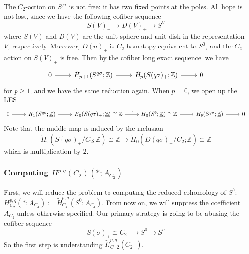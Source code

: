 \documentclass{article}
\theoremstyle{definition}
\theoremstyle{definition}
\theoremstyle{definition}
\theoremstyle{definition}
\theoremstyle{definition}
\theoremstyle{definition}
\theoremstyle{definition}
\begin{document}
The $C_2$-action on $S^{q\sigma}$ is not free: it has two fixed points at the poles. All hope is not lost, since we have the following cofiber sequence 
\[S(V)_{+}\to D(V)_{+}\to S^V\]
where $S(V)$ and $D(V)$ are the unit sphere and unit disk in the representation $V$, respectively. Moreover, $D(n)_{+}$ is $C_2$-homotopy equivalent to $S^0$, and the $C_2$-action on $S(V)_+$ is free. Then by the cofiber long exact sequence, we have 
\[\begin{tikzcd}
0\arrow[r]&\tilde{H}_{p+1}(S^{q\sigma};\underline{\mathbb{Z}})\arrow[r]&\tilde{H}_{p}(S(q\sigma)_+;\underline{\mathbb{Z}})\arrow[r]&0
\end{tikzcd}\]
for $p\geq 1$, and we have the same reduction again. When $p=0$, we open up the LES 
\[\begin{tikzcd}
 0\arrow[r]&\tilde{H}_{1}(S^{q\sigma};\underline{\mathbb{Z}})\arrow[r]&\tilde{H}_{0}(S(q\sigma)_+;\underline{\mathbb{Z}})\cong \mathbb{Z}\arrow[r,"\gamma"]&\tilde{H}_{0}(S^0;\underline{\mathbb{Z}})\cong \mathbb{Z}\arrow[r]&\tilde{H}_{0}(S^{q\sigma};\underline{\mathbb{Z}})\arrow[r]&0
    \end{tikzcd}\]
Note that the middle map is induced by the inclusion 
\[\tilde{H}_0(S(q\sigma)_+/C_2;\mathbb{Z})\cong \mathbb{Z}\to \tilde{H}_0(D(q\sigma)_+/C_2;\mathbb{Z})\cong \mathbb{Z}\]
which is multiplication by $2$. 

\subsubsection{Computing $H^{p,q}(C_2)(*; A_{C_2})$}
First, we will reduce the problem to computing the reduced cohomology of $S^0$: $H^{p,q}_{C_2}(*; A_{C_2}):= \tilde{H}^{p,q}_{C_2}(S^0; A_{C_2})$. From now on, we will suppress the coefficient $A_{C_2}$ unless otherwise specified. Our primary strategy is going to be abusing the cofiber sequence 
\[S(\sigma)_+\cong C_{2_{+}}\to S^0\to S^{\sigma} \]
So the first step is understanding $\tilde{H}^{p,q}_{C_+2}(C_{2_+})$.
\end{document}

